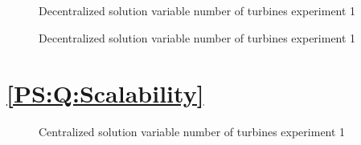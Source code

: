 \subsection{}



\begin{figure}[h]
	\centering
	
	\caption{Decentralized solution variable number of turbines experiment 1}
	\label{fig:exp:decen:turbines}
\end{figure}

\begin{figure}[h]
	\centering
	
	\caption{Decentralized solution variable number of turbines experiment 1}
	\label{fig:exp:decen:turbines_cache}
\end{figure}

\section{\ref{PS:Q:Scalability}}

\begin{figure}[h]
	\centering
	
	\caption{Centralized solution variable number of turbines experiment 1}
	\label{fig:exp:cen:turbines}
\end{figure}

